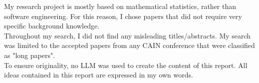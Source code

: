 My research project is mostly based on mathematical statistics, rather than software engineering. For this reason, I chose papers that did not require very specific background knowledge. \\
Throughout my search, I did not find any misleading titles/abstracts. My search was limited to the accepted papers from any CAIN conference that were classified as "long papers".\\
To ensure originality, no LLM was used to create the content of this report. All ideas contained in this report are expressed in my own words.